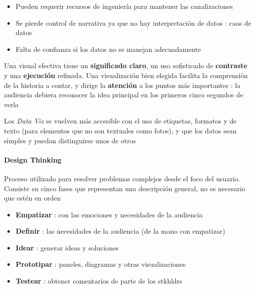 \begin{itemize}
{\begin{description}
{\begin{itemize}
        \end{itemize}}
        \item[Contras]{
        \begin{itemize}
            \item {Pueden requerir recursos de ingeniería para mantener las canalizaciones}
            \item {Se pierde control de narrativa ya que no hay interpretación de datos : caos de datos}
            \item {Falta de confianza si los datos no se manejan adecuadamente}
        \end{itemize}
        }
    \end{description}}
\end{itemize}
Una visual efectiva tiene un \textbf{significado claro}, un uso sofisticado de \textbf{contraste} y una \textbf{ejecución} refinada. Una visualización bien elegida facilita la comprensión de la historia a contar, y dirige la \textbf{atención} a los puntos más importantes : la audiencia debiera reconocer la idea principal en los primeros cinco segundos de verla

Los \textit{Data Viz} se vuelven más accesible con el uso de etiquetas, formatos y de texto (para elementos que no son textuales como fotos), y que los datos sean simples y puedan distinguirse unos de otros

\paragraph{Design Thinking}
Proceso utilizado para resolver problemas complejos desde el foco del usuario. Consiste en cinco fases que representan una descripción general, no es necesario que estén en orden
\begin{itemize}
    \item {\textbf{Empatizar} : con las emociones y necesidades de la audiencia}
    \item {\textbf{Definir} : las necesidades de la audiencia (de la mano con empatizar)}
    \item {\textbf{Idear} : generar ideas y soluciones} 
    \item {\textbf{Prototipar} : paneles, diagramas y otras visualizaciones}
    \item {\textbf{Testear} : obtener comentarios de parte de los \gls{stkhldrs}}
\end{itemize}


